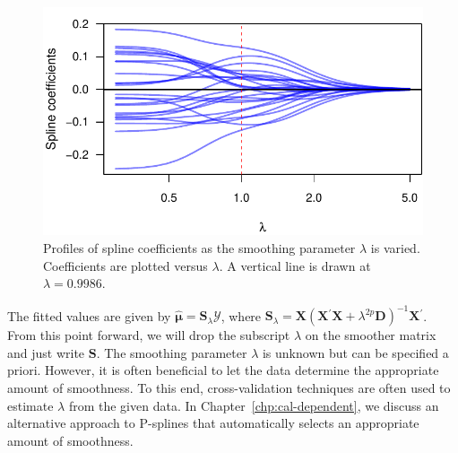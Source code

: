\documentclass[cmfont,usenames,dvipsnames,leqno]{afit-etd}\usepackage[]{graphicx}\usepackage[]{color}
\makeatletter
\def\maxwidth{ %
  \ifdim\Gin@nat@width>\linewidth
    \linewidth
  \else
    \Gin@nat@width
  \fi
}
\newenvironment{knitrout}{}{} %
\renewenvironment{knitrout}{\begin{singlespace}}{\end{singlespace}}
\newcommand{\trans}{\ensuremath{^\prime}}
\newcommand{\bc}[1]{\ensuremath{\bm{\mathcal{#1}}}}
\newcommand{\wh}[1]{\ensuremath{\widehat{#1}}}
\newcommand{\X}{\ensuremath{\bm{X}}}
\makeatother
\begin{document}
\begin{knitrout}
\color{fgcolor}\begin{figure}[!htb]

\includegraphics[width=\maxwidth]{figure/sinc-example-2} \caption[Sinc function spline coefficient profiles]{Profiles of spline coefficients as the smoothing parameter $\lambda$ is varied. Coefficients are plotted versus $\lambda$. A vertical line is drawn at $\lambda = 0.9986$.\label{fig:sinc-example-2}}
\end{figure}


\end{knitrout}


The fitted values are given by $\wh{\bm{\mu}} = \bm{S}_\lambda \bc{Y}$, where $\bm{S}_\lambda = \X\left( \X\trans\X + \lambda^{2p}\bm{D} \right)^{-1}\X\trans$. From this point forward, we will drop the subscript $\lambda$ on the smoother matrix and just write $\bm{S}$. The smoothing parameter $\lambda$ is unknown but can be specified a priori. However, it is often beneficial to let the data determine the appropriate amount of smoothness. To this end, cross-validation techniques are often used to estimate $\lambda$ from the given data. In Chapter~\ref{chp:cal-dependent}, we discuss an alternative approach to \acp{P-spline} that automatically selects an appropriate amount of smoothness.
\end{document}

